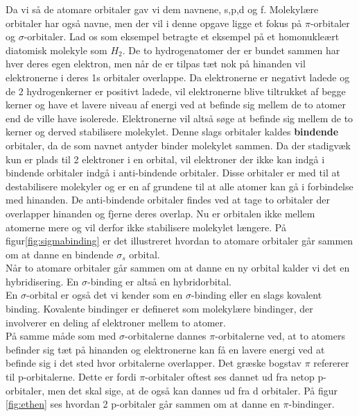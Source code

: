 Da vi så de atomare orbitaler gav vi dem navnene, s,p,d og f. Molekylære orbitaler har også navne, men der vil i denne opgave ligge et fokus på $\pi$-orbitaler og $\sigma$-orbitaler. Lad os som eksempel betragte et eksempel på et homonukleært diatomisk molekyle som $H_2$. De to hydrogenatomer der er bundet sammen har hver deres egen elektron, men når de er tilpas tæt nok på hinanden vil elektronerne i deres 1s orbitaler overlappe. Da elektronerne er negativt ladede og de 2 hydrogenkerner er positivt ladede, vil elektronerne blive tiltrukket af begge kerner og have et lavere niveau af energi ved at befinde sig mellem de to atomer end de ville have isolerede. Elektronerne vil altså søge at befinde sig mellem de to kerner og derved stabilisere molekylet. Denne slags orbitaler kaldes \textbf{bindende} orbitaler, da de som navnet antyder binder molekylet sammen. Da der stadigvæk kun er plads til 2  elektroner i en orbital, vil elektroner der ikke kan indgå i bindende orbitaler indgå i anti-bindende orbitaler. Disse orbitaler er med til at destabilisere molekyler og er en af grundene til at alle atomer kan gå i forbindelse med hinanden. De anti-bindende orbitaler findes ved at tage to orbitaler der overlapper hinanden og fjerne deres overlap. Nu er orbitalen ikke mellem atomerne mere og vil derfor ikke stabilisere molekylet længere. På figur\ref{fig:sigmabinding} er det illustreret hvordan to atomare orbitaler går sammen om at danne en bindende $\sigma_s$ orbital. 
\\

Når to atomare orbitaler går sammen om at danne en ny orbital kalder vi det en hybridisering. En $\sigma$-binding er altså en hybridorbital.
\\

En $\sigma$-orbital er også det vi kender som en $\sigma$-binding eller en slags kovalent binding. Kovalente bindinger er defineret som molekylære bindinger, der involverer en deling af elektroner mellem to atomer.
\\

På samme måde som med $\sigma$-orbitalerne dannes $\pi$-orbitalerne ved, at to atomers befinder sig tæt på hinanden og elektronerne kan få en lavere energi ved at befinde sig i det sted hvor orbitalerne overlapper. Det græske bogstav $\pi$ refererer til p-orbitalerne. Dette er fordi $\pi$-orbitaler oftest ses dannet ud fra netop p-orbitaler, men det skal sige, at de også kan dannes ud fra d orbitaler. På figur \ref{fig:ethen} ses hvordan 2 p-orbitaler går sammen om at danne en $\pi$-bindinger. 
	
